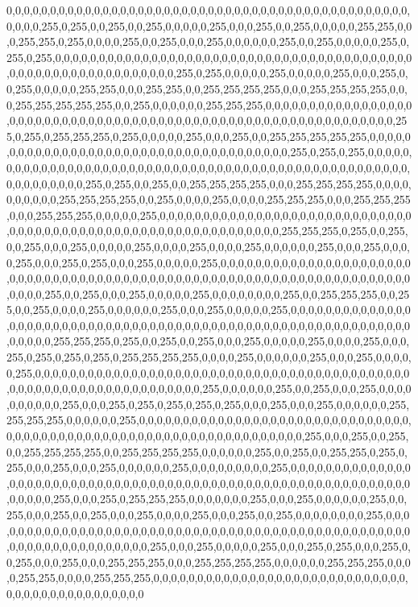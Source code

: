 \begin{DoxyCompactItemize}
0,0,0,0,0,0,0,0,0,0,0,0,0,0,0,0,0,0,0,0,0,0,0,0,0,0,0,0,0,0,0,0,0,0,0,0,0,0,0,0,0,0,0,0,0,0,0,0,0,0,255,0,255,0,0,255,0,0,255,0,0,0,0,0,255,0,0,0,255,0,0,255,0,0,0,0,0,255,255,0,0,0,255,255,0,255,0,0,0,0,255,0,0,255,0,0,0,255,0,0,0,0,0,0,255,0,0,255,0,0,0,0,0,255,0,255,0,255,0,0,0,0,0,0,0,0,0,0,0,0,0,0,0,0,0,0,0,0,0,0,0,0,0,0,0,0,0,0,0,0,0,0,0,0,0,0,0,0,0,0,0,0,0,0,0,0,0,0,0,0,0,0,0,0,0,0,0,0,255,0,255,0,0,0,0,0,255,0,0,0,0,0,255,0,0,0,255,0,0,255,0,0,0,0,0,255,255,0,0,0,255,255,0,0,255,255,255,255,0,0,0,255,255,255,255,0,0,0,255,255,255,255,255,0,0,255,0,0,0,0,0,0,255,255,255,0,0,0,0,0,0,0,0,0,0,0,0,0,0,0,0,0,0,0,0,0,0,0,0,0,0,0,0,0,0,0,0,0,0,0,0,0,0,0,0,0,0,0,0,0,0,0,0,0,0,0,0,0,0,0,0,0,0,0,0,0,255,0,255,0,255,255,255,0,255,0,0,0,0,0,255,0,0,0,255,0,0,255,255,255,255,255,0,0,0,0,0,0,0,0,0,0,0,0,0,0,0,0,0,0,0,0,0,0,0,0,0,0,0,0,0,0,0,0,0,0,0,0,0,255,0,255,0,255,0,0,0,0,0,0,0,0,0,0,0,0,0,0,0,0,0,0,0,0,0,0,0,0,0,0,0,0,0,0,0,0,0,0,0,0,0,0,0,0,0,0,0,0,0,0,0,0,0,0,0,0,0,0,0,0,0,0,0,0,255,0,255,0,0,255,0,0,255,255,255,255,0,0,0,255,255,255,255,0,0,0,0,0,0,0,0,0,0,255,255,255,255,0,0,255,0,0,0,0,255,0,0,0,0,255,255,255,0,0,0,255,255,255,0,0,0,255,255,255,0,0,0,0,0,255,0,0,0,0,0,0,0,0,0,0,0,0,0,0,0,0,0,0,0,0,0,0,0,0,0,0,0,0,0,0,0,0,0,0,0,0,0,0,0,0,0,0,0,0,0,0,0,0,0,0,0,0,0,0,0,0,0,0,0,0,255,255,255,0,255,0,0,255,0,0,255,0,0,0,255,0,0,0,0,0,255,0,0,0,0,255,0,0,0,0,255,0,0,0,0,0,0,255,0,0,0,255,0,0,0,0,255,0,0,0,255,0,255,0,0,0,255,0,0,0,0,0,255,0,0,0,0,0,0,0,0,0,0,0,0,0,0,0,0,0,0,0,0,0,0,0,0,0,0,0,0,0,0,0,0,0,0,0,0,0,0,0,0,0,0,0,0,0,0,0,0,0,0,0,0,0,0,0,0,0,0,0,0,0,0,0,0,0,0,0,0,0,0,0,0,255,0,0,255,0,0,0,255,0,0,0,0,0,255,0,0,0,0,0,0,0,0,255,0,0,255,255,255,0,0,255,0,0,255,0,0,0,0,255,0,0,0,0,0,0,255,0,0,0,255,0,0,0,0,0,255,0,0,0,0,0,0,0,0,0,0,0,0,0,0,0,0,0,0,0,0,0,0,0,0,0,0,0,0,0,0,0,0,0,0,0,0,0,0,0,0,0,0,0,0,0,0,0,0,0,0,0,0,0,0,0,0,0,0,0,0,0,0,0,0,0,255,255,255,0,255,0,0,255,0,0,255,0,0,0,255,0,0,0,0,0,255,0,0,0,0,255,0,0,0,255,0,255,0,255,0,255,0,255,255,255,255,0,0,0,0,255,0,0,0,0,0,0,255,0,0,0,255,0,0,0,0,0,255,0,0,0,0,0,0,0,0,0,0,0,0,0,0,0,0,0,0,0,0,0,0,0,0,0,0,0,0,0,0,0,0,0,0,0,0,0,0,0,0,0,0,0,0,0,0,0,0,0,0,0,0,0,0,0,0,0,0,0,0,0,0,0,0,0,255,0,0,0,0,0,0,255,0,0,255,0,0,0,255,0,0,0,0,0,0,0,0,0,0,255,0,0,0,255,0,255,0,255,0,255,0,255,0,0,0,255,0,0,0,255,0,0,0,0,0,0,255,255,255,255,0,0,0,0,0,0,255,0,0,0,0,0,0,0,0,0,0,0,0,0,0,0,0,0,0,0,0,0,0,0,0,0,0,0,0,0,0,0,0,0,0,0,0,0,0,0,0,0,0,0,0,0,0,0,0,0,0,0,0,0,0,0,0,0,0,0,0,0,0,0,0,0,255,0,0,0,255,0,0,255,0,0,255,255,255,255,0,0,255,255,255,255,0,0,0,0,0,0,255,0,0,255,0,0,255,255,0,255,0,255,0,0,0,255,0,0,0,255,0,0,0,0,0,0,255,0,0,0,0,0,0,0,0,0,255,0,0,0,0,0,0,0,0,0,0,0,0,0,0,0,0,0,0,0,0,0,0,0,0,0,0,0,0,0,0,0,0,0,0,0,0,0,0,0,0,0,0,0,0,0,0,0,0,0,0,0,0,0,0,0,0,0,0,0,0,0,0,0,0,0,255,0,0,0,255,0,255,255,255,0,0,0,0,0,0,0,255,0,0,0,255,0,0,0,0,0,0,255,0,0,255,0,0,0,255,0,0,255,0,0,0,255,0,0,0,0,255,0,0,0,255,0,0,255,0,0,0,0,0,0,0,0,255,0,0,0,0,0,0,0,0,0,0,0,0,0,0,0,0,0,0,0,0,0,0,0,0,0,0,0,0,0,0,0,0,0,0,0,0,0,0,0,0,0,0,0,0,0,0,0,0,0,0,0,0,0,0,0,0,0,0,0,0,0,0,0,0,0,255,0,0,0,255,0,0,0,0,0,255,0,0,0,255,0,255,0,0,0,255,0,0,255,0,0,0,255,0,0,0,255,255,255,0,0,0,255,255,255,255,0,0,0,0,0,0,255,255,255,0,0,0,0,255,255,0,0,0,0,255,255,255,0,0,0,0,0,0,0,0,0,0,0,0,0,0,0,0,0,0,0,0,0,0,0,0,0,0,0,0,0,0,0,0,0,0,0,0,0,0,0,0,0,0,0,0,0
\end{DoxyCompactItemize}
